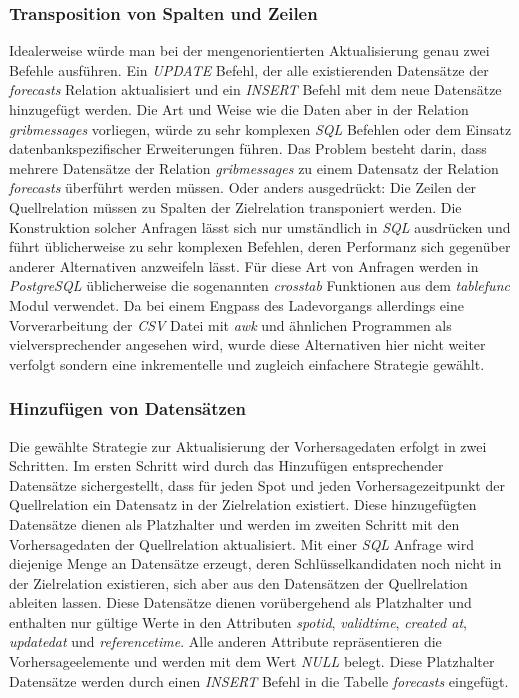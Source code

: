 \subsubsection{Transposition von Spalten und Zeilen}
Idealerweise würde man bei der mengenorientierten Aktualisierung genau
zwei Befehle ausführen. Ein \textit{UPDATE} Befehl, der alle
existierenden Datensätze der \textit{forecasts} Relation aktualisiert
und ein \textit{INSERT} Befehl mit dem neue Datensätze hinzugefügt
werden. Die Art und Weise wie die Daten aber in der Relation
\textit{grib\textunderscore messages} vorliegen, würde zu sehr
komplexen \textit{SQL} Befehlen oder dem Einsatz datenbankspezifischer
Erweiterungen führen. Das Problem besteht darin, dass mehrere
Datensätze der Relation \textit{grib\textunderscore messages} zu einem
Datensatz der Relation \textit{forecasts} überführt werden
müssen. Oder anders ausgedrückt: Die Zeilen der Quellrelation müssen
zu Spalten der Zielrelation transponiert werden. Die Konstruktion
solcher Anfragen lässt sich nur umständlich in \textit{SQL} ausdrücken
und führt üblicherweise zu sehr komplexen Befehlen, deren Performanz
sich gegenüber anderer Alternativen anzweifeln lässt. Für diese Art
von Anfragen werden in \textit{PostgreSQL} üblicherweise die
sogenannten \textit{crosstab} Funktionen aus dem \textit{tablefunc}
Modul verwendet. Da bei einem Engpass des Ladevorgangs allerdings eine
Vorverarbeitung der \textit{CSV} Datei mit \textit{awk} und ähnlichen
Programmen als vielversprechender angesehen wird, wurde diese
Alternativen hier nicht weiter verfolgt sondern eine inkrementelle und
zugleich einfachere Strategie gewählt. 

\subsubsection{Hinzufügen von Datensätzen}
Die gewählte Strategie zur Aktualisierung der Vorhersagedaten erfolgt
in zwei Schritten. Im ersten Schritt wird durch das Hinzufügen
entsprechender Datensätze sichergestellt, dass für jeden Spot und
jeden Vorhersagezeitpunkt der Quellrelation ein Datensatz in der
Zielrelation existiert. Diese hinzugefügten Datensätze dienen als
Platzhalter und werden im zweiten Schritt mit den Vorhersagedaten der
Quellrelation aktualisiert. Mit einer \textit{SQL} Anfrage wird
diejenige Menge an Datensätze erzeugt, deren Schlüsselkandidaten noch
nicht in der Zielrelation existieren, sich aber aus den Datensätzen
der Quellrelation ableiten lassen. Diese Datensätze dienen
vorübergehend als Platzhalter und enthalten nur gültige Werte in den
Attributen \textit{spot\textunderscore id},
\textit{valid\textunderscore time}, \textit{created\textunderscore
  at}, \textit{updated\textunderscore at} und
\textit{reference\textunderscore time}. Alle anderen Attribute
repräsentieren die Vorhersageelemente und werden mit dem Wert
\textit{NULL} belegt. Diese Platzhalter Datensätze werden durch einen
\textit{INSERT} Befehl in die Tabelle \textit{forecasts} eingefügt.

